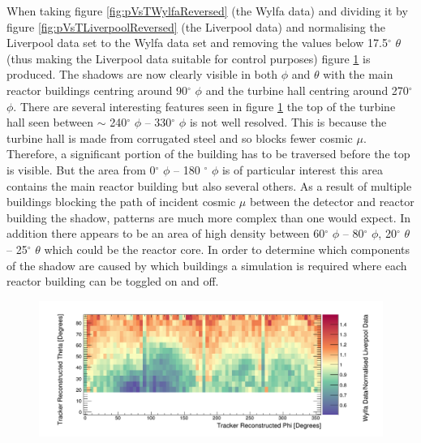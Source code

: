 When taking figure \ref{fig:pVsTWylfaReversed} (the Wylfa data) and dividing it by figure \ref{fig:pVsTLiverpoolReversed} (the Liverpool data) and normalising the Liverpool data set to the Wylfa data set and removing the values below 17.5$^\circ$ $\theta$ (thus making the Liverpool data suitable for control purposes) figure \ref{fig:measuredTrackerReconNoLines} is produced. The shadows are now clearly visible in both $\phi$ and $\theta$ with the main reactor buildings centring around 90$^\circ$ $\phi$ and the turbine hall centring around 270$^\circ$ $\phi$. There are several interesting features seen in figure \ref{fig:measuredTrackerReconNoLines} the top of the turbine hall seen between $\sim$ 240$^\circ$ $\phi$ -- 330$^\circ$ $\phi$ is not well resolved. This is because the turbine hall is made from corrugated steel and so blocks fewer cosmic $\mu$. Therefore, a significant portion of the building has to be traversed before the top is visible. But the area from 0$^\circ$ $\phi$ -- 180 $^\circ$ $\phi$ is of particular interest this area contains the main reactor building but also several others. As a result of multiple buildings blocking the path of incident cosmic $\mu$ between the detector and reactor building the shadow, patterns are much more complex than one would expect. In addition there appears to be an area of high density between 60$^\circ$ $\phi$ -- 80$^\circ$ $\phi$, 20$^\circ$ $\theta$ -- 25$^\circ$ $\theta$ which could be the reactor core. In order to determine which components of the shadow are caused by which buildings a simulation is required where each reactor building can be toggled on and off.

\begin{figure}[htbp]
 \centering
 \includegraphics[width=\linewidth]{Chapter5/Figs/wylfaRasterNew/measuredTrackerReconNoLines.png}
 \label{fig:measuredTrackerReconNoLines}
\end{figure}

